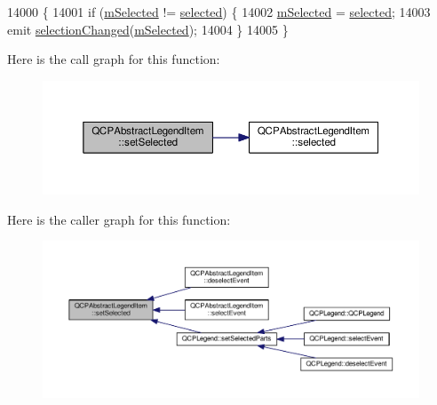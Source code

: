 \begin{DoxyCode}
14000                                                      \{
14001   \textcolor{keywordflow}{if} (\hyperlink{class_q_c_p_abstract_legend_item_ae58ebebbd0c36cc6fe897483369984d2}{mSelected} != \hyperlink{class_q_c_p_abstract_legend_item_ac776e68e3367704452131c6aa9908bb9}{selected}) \{
14002     \hyperlink{class_q_c_p_abstract_legend_item_ae58ebebbd0c36cc6fe897483369984d2}{mSelected} = \hyperlink{class_q_c_p_abstract_legend_item_ac776e68e3367704452131c6aa9908bb9}{selected};
14003     emit \hyperlink{class_q_c_p_abstract_legend_item_a7cb61fdfbaf69c590bacb8f9e7099d9e}{selectionChanged}(\hyperlink{class_q_c_p_abstract_legend_item_ae58ebebbd0c36cc6fe897483369984d2}{mSelected});
14004   \}
14005 \}
\end{DoxyCode}


Here is the call graph for this function\+:\nopagebreak
\begin{figure}[H]
\begin{center}
\leavevmode
\includegraphics[width=350pt]{class_q_c_p_abstract_legend_item_a6eed93b0ab99cb3eabb043fb08179c2b_cgraph}
\end{center}
\end{figure}




Here is the caller graph for this function\+:\nopagebreak
\begin{figure}[H]
\begin{center}
\leavevmode
\includegraphics[width=350pt]{class_q_c_p_abstract_legend_item_a6eed93b0ab99cb3eabb043fb08179c2b_icgraph}
\end{center}
\end{figure}



